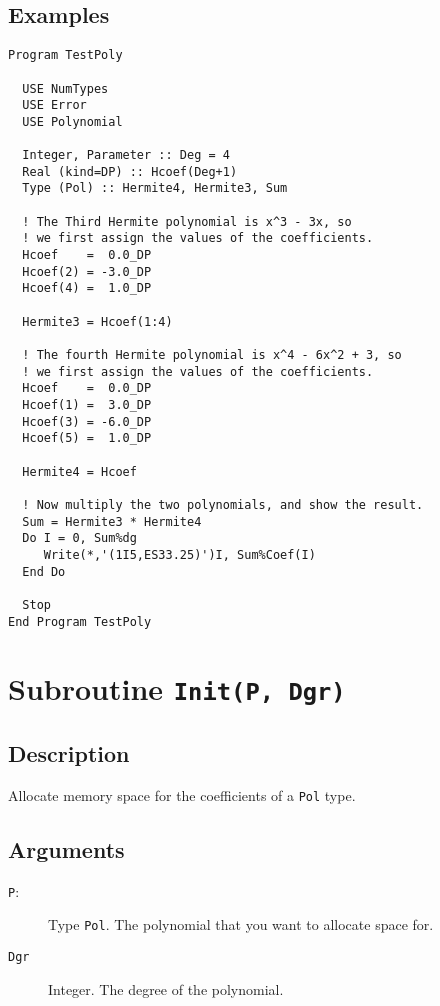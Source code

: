 \subsection{Examples}

\begin{verbatim}
Program TestPoly

  USE NumTypes
  USE Error
  USE Polynomial

  Integer, Parameter :: Deg = 4
  Real (kind=DP) :: Hcoef(Deg+1)
  Type (Pol) :: Hermite4, Hermite3, Sum

  ! The Third Hermite polynomial is x^3 - 3x, so
  ! we first assign the values of the coefficients.
  Hcoef    =  0.0_DP
  Hcoef(2) = -3.0_DP
  Hcoef(4) =  1.0_DP

  Hermite3 = Hcoef(1:4)

  ! The fourth Hermite polynomial is x^4 - 6x^2 + 3, so
  ! we first assign the values of the coefficients.
  Hcoef    =  0.0_DP
  Hcoef(1) =  3.0_DP
  Hcoef(3) = -6.0_DP
  Hcoef(5) =  1.0_DP

  Hermite4 = Hcoef

  ! Now multiply the two polynomials, and show the result.
  Sum = Hermite3 * Hermite4
  Do I = 0, Sum%dg
     Write(*,'(1I5,ES33.25)')I, Sum%Coef(I)
  End Do

  Stop
End Program TestPoly
\end{verbatim}


\section{Subroutine \texttt{Init(P, Dgr)}}

\subsection{Description}

Allocate memory space for the coefficients of a \texttt{Pol} type.

\subsection{Arguments}

\begin{description}
\item[\texttt{P}:] Type \texttt{Pol}. The polynomial that you want
  to allocate space for.
\item[\texttt{Dgr}] Integer. The degree of the polynomial.
\end{description}

